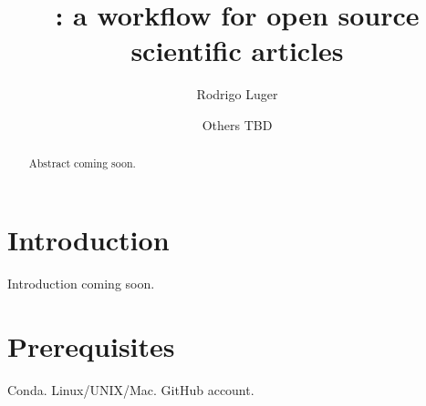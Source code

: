 \documentclass[twocolumn]{aastex631}
\begin{document}
\title{\showyourwork: a workflow for open source scientific articles}

\author[0000-0002-0296-3826]{Rodrigo Luger}
\author{Others TBD}

\begin{abstract}
    Abstract coming soon.
\end{abstract}

\section{Introduction}

Introduction coming soon.

\section{Prerequisites}
\label{sec:prereq}
Conda. Linux/UNIX/Mac. GitHub account.
\end{document}
